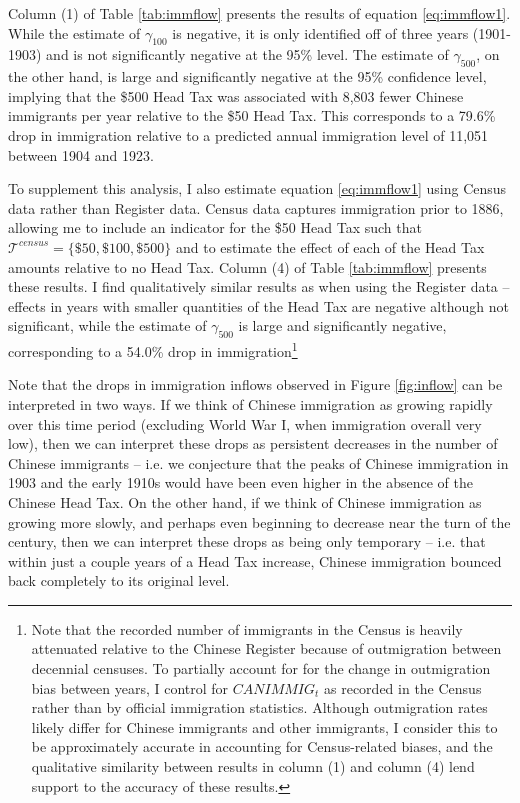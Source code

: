 Column (1) of Table \ref{tab:immflow} presents the results of equation \eqref{eq:immflow1}. While the estimate of $\gamma_{100}$ is negative, it is only identified off of three years (1901-1903) and is not significantly negative at the 95\% level. The estimate of $\gamma_{500}$, on the other hand, is large and significantly negative at the 95\% confidence level, implying that the \$500 Head Tax was associated with 8,803 fewer Chinese immigrants per year relative to the \$50 Head Tax. This corresponds to a 79.6\% drop in immigration relative to a predicted annual immigration level of 11,051 between 1904 and 1923. 

To supplement this analysis, I also estimate equation \eqref{eq:immflow1} using Census data rather than Register data. Census data captures immigration prior to 1886, allowing me to include an indicator for the \$50 Head Tax such that $\mathcal{T}^{census} = \{\$50,\$100,\$500\}$ and to estimate the effect of each of the Head Tax amounts relative to no Head Tax. Column (4) of Table \ref{tab:immflow} presents these results. 
I find qualitatively similar results as when using the Register data -- effects in years with smaller quantities of the Head Tax are negative although not significant, while the estimate of $\gamma_{500}$ is large and significantly negative, corresponding to a 54.0\% drop in immigration\footnote{Note that the recorded number of immigrants in the Census is heavily attenuated relative to the Chinese Register because of outmigration between decennial censuses. 
To partially account for for the change in outmigration bias between years, I control for $CANIMMIG_t$ as recorded in the Census rather than by official immigration statistics. Although outmigration rates likely differ for Chinese immigrants and other immigrants, I consider this to be approximately accurate in accounting for Census-related biases, and the qualitative similarity between results in column (1) and column (4) lend support to the accuracy of these results.}

Note that the drops in immigration inflows observed in Figure \ref{fig:inflow} can be interpreted in two ways. If we think of Chinese immigration as growing rapidly over this time period (excluding World War I, when immigration overall very low), then we can interpret these drops as persistent decreases in the number of Chinese immigrants -- i.e. we conjecture that the peaks of Chinese immigration in 1903 and the early 1910s would have been even higher in the absence of the Chinese Head Tax. On the other hand, if we think of Chinese immigration as growing more slowly, and perhaps even beginning to decrease near the turn of the century, then we can interpret these drops as being only temporary -- i.e. that within just a couple years of a Head Tax increase, Chinese immigration bounced back completely to its original level.

